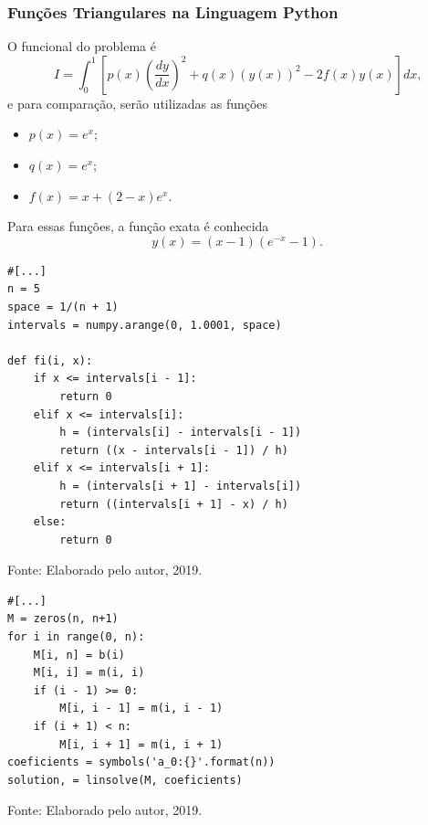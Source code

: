 \documentclass{beamer}
\newcommand{\fonte}[1]{
	\begin{center}
		\footnotesize Fonte: #1
	\end{center}
}
\newcommand{\fonteElaboradoPeloAutor}{
	\fonte{Elaborado pelo autor, 2019.}
}
\begin{document}
	\begin{frame}
		\frametitle{Funções Triangulares na Linguagem Python}
		\justify
		
		O funcional do problema é
		$$
			I = \int_{0}^{1} \left [ 
					p(x) \left ( 
						\frac{dy}{dx}
					\right )^2
					+ q(x)(y(x))^2 
					- 2f(x)y(x) 
				\right ] dx
				\text{,}
		$$
		\pause
		e para comparação, serão utilizadas as funções
		\begin{itemize}
			\item $p(x)=e^x$;
			\item $q(x)=e^x$;
			\item $f(x)=x+(2-x)e^x$.
		\end{itemize}
		\pause
		
		Para essas funções, a função exata é conhecida
		$$
			y(x)=(x-1)(e^{-x}-1)
			\text{.}
		$$
	\end{frame}
	
	
	\begin{frame}[containsverbatim]
		\vspace{-8pt}
		\begin{lstlisting}[style=Python, numbers=none, caption={Trechos do código sobre funções triangulares}, captionpos=t]
#[...]
n = 5
space = 1/(n + 1)
intervals = numpy.arange(0, 1.0001, space)

def fi(i, x):
    if x <= intervals[i - 1]:
        return 0
    elif x <= intervals[i]:
        h = (intervals[i] - intervals[i - 1])
        return ((x - intervals[i - 1]) / h)
    elif x <= intervals[i + 1]:
        h = (intervals[i + 1] - intervals[i])
        return ((intervals[i + 1] - x) / h)
    else:
        return 0
		\end{lstlisting}
		\fonteElaboradoPeloAutor
	\end{frame}
	
	\begin{frame}[containsverbatim]
		\begin{lstlisting}[style=Python, numbers=none, caption={Trechos do código sobre funções triangulares}, captionpos=t]
#[...]
M = zeros(n, n+1)
for i in range(0, n):
    M[i, n] = b(i)
    M[i, i] = m(i, i)
    if (i - 1) >= 0:
        M[i, i - 1] = m(i, i - 1)
    if (i + 1) < n:
        M[i, i + 1] = m(i, i + 1)
coeficients = symbols('a_0:{}'.format(n))
solution, = linsolve(M, coeficients)
		\end{lstlisting}
		\fonteElaboradoPeloAutor
	\end{frame}
	
\end{document}
